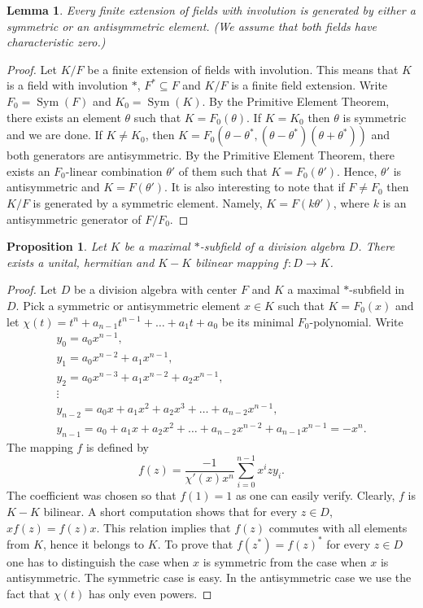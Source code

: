\documentclass[12pt,reqno]{amsart}
\newtheorem{prop}[thm]{Proposition}
\newtheorem{lem}[thm]{Lemma}
\theoremstyle{definition}
\DeclareMathOperator{\sym}{Sym}
\begin{document}
\begin{lem}
\label{anti}
Every finite extension of fields with involution is generated
by either a symmetric or an antisymmetric element.
(We assume that both fields have characteristic zero.)
\end{lem}

\begin{proof}
Let $K/F$ be a finite extension of fields with involution. 
This means that $K$ is a field with involution $\ast$, 
$F^\ast \subseteq F$ and $K/F$ is a finite field extension.
Write $F_0 = \sym(F)$ and $K_0 = \sym(K)$. By the Primitive Element Theorem,
there exists an element $\theta$ such that $K = F_0(\theta)$. 
If $K=K_0$ then $\theta$ is symmetric and we are done. If $K \ne K_0$, 
then $K = F_0(\theta-\theta^\ast,(\theta-\theta^\ast)(\theta+\theta^\ast))$
and both generators are antisymmetric. By the Primitive Element Theorem, there exists
an $F_0$-linear combination $\theta'$ of them such that $K=F_0(\theta')$. Hence,
$\theta'$ is antisymmetric and $K=F(\theta')$. It is also interesting to note that
if $F \ne F_0$ then $K/F$ is generated by a symmetric element. 
Namely, $K=F(k \theta')$, where $k$ is an antisymmetric generator of $F/F_0$.
\end{proof}

\begin{prop}
Let $K$ be a maximal $\ast$-subfield of a division algebra $D$.
There exists a unital, hermitian and $K-K$ bilinear mapping $f \colon D \to K$.
\end{prop}

\begin{proof}
Let $D$ be a division algebra with center $F$ and $K$ a maximal $\ast$-subfield in $D$.
Pick a symmetric or antisymmetric element $x \in K$ such that $K = F_0(x)$
and let $\chi(t) = t^n+a_{n-1}t^{n-1}+\ldots+a_1 t+a_0$ be its minimal $F_0$-polynomial.
Write
\[
\begin{array}{l}
y_0 = a_0 x^{n-1}, \\
y_1 = a_0 x^{n-2}+a_1 x^{n-1}, \\
y_2 = a_0 x^{n-3}+a_1 x^{n-2}+a_2 x^{n-1}, \\
\vdots \\
y_{n-2} = a_0 x+ a_1 x^2 +a_2 x^3+\ldots+a_{n-2} x^{n-1}, \\
y_{n-1} = a_0 + a_1 x+a_2 x^2+\ldots+a_{n-2}x^{n-2}+a_{n-1}x^{n-1} = -x^n.
\end{array}
\]
The mapping $f$ is defined by
\[
f(z)=\frac{-1}{\chi'(x) x^n} \sum_{i=0}^{n-1} x^i z y_i.
\]
The coefficient was chosen so that $f(1)=1$ as one can easily verify.
Clearly, $f$ is $K-K$ bilinear. A short computation shows that for every $z \in D$,
$xf(z) = f(z)x$. This relation implies that $f(z)$ commutes with all elements from $K$, 
hence it belongs to $K$. To prove that $f(z^\ast) = f(z)^\ast$ for every $z \in D$ one
has to distinguish the case when $x$ is symmetric from the case when $x$ is antisymmetric.
The symmetric case is easy. In the antisymmetric case we use the fact that $\chi(t)$ has only even powers.
\end{proof}
\end{document}
